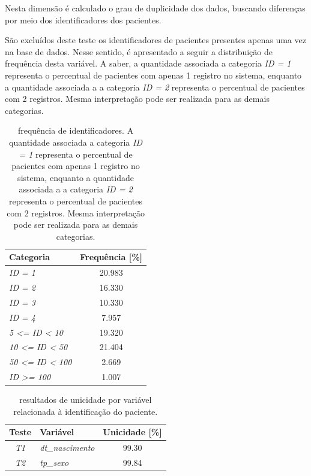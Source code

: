 \documentclass[
  12,
]{proadi}
\begin{document}
\label{sub:unicidade}

Nesta dimensão é calculado o grau de duplicidade dos dados, buscando
diferenças por meio dos identificadores dos pacientes.

São excluídos deste teste os identificadores de pacientes presentes
apenas uma vez na base de dados. Nesse sentido, é apresentado a seguir a
distribuição de frequência desta variável. A saber, a quantidade
associada a categoria \emph{ID = 1} representa o percentual de pacientes
com apenas 1 registro no sistema, enquanto a quantidade associada a a
categoria \emph{ID = 2} representa o percentual de pacientes com 2
registros. Mesma interpretação pode ser realizada para as demais
categorias.

\begin{table}[H]

\caption{\label{tab:unnamed-chunk-16}frequência de identificadores. A quantidade associada a categoria \textit{ID = 1} representa o percentual de pacientes com apenas 1 registro no sistema, enquanto a quantidade associada a a categoria \textit{ID = 2} representa o percentual de pacientes com 2 registros. Mesma interpretação pode ser realizada para as demais categorias.}
\centering
\fontsize{10}{12}\selectfont
\begin{tabular}[t]{>{}lc}
\toprule
Categoria & Frequência [\%]\\
\midrule
\em{ID = 1} & 20.983\\
\em{ID = 2} & 16.330\\
\em{ID = 3} & 10.330\\
\em{ID = 4} & 7.957\\
\em{5 <= ID < 10} & 19.320\\
\addlinespace
\em{10 <= ID < 50} & 21.404\\
\em{50 <= ID < 100} & 2.669\\
\em{ID >= 100} & 1.007\\
\bottomrule
\end{tabular}
\end{table}

\begin{table}[H]

\caption{\label{tab:unnamed-chunk-17}resultados de unicidade por variável relacionada à identificação do paciente.}
\centering
\fontsize{10}{12}\selectfont
\begin{tabular}[t]{>{}c>{}lc}
\toprule
Teste & Variável & Unicidade [\%]\\
\midrule
\em{T1} & \em{dt\_nascimento} & 99.30\\
\em{T2} & \em{tp\_sexo} & 99.84\\
\bottomrule
\end{tabular}
\end{table}
\end{document}
